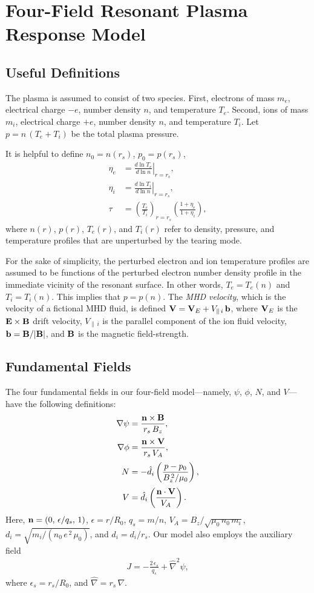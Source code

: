 \documentclass[12pt,prb,aps]{revtex4-1}
\begin{document}
\section{Four-Field Resonant Plasma Response Model}\label{sfour}
\subsection{Useful Definitions}
The plasma is assumed to consist of two species. First, electrons of mass $m_e$, electrical charge $-e$, 
number density $n$, and temperature $T_e$.  Second, ions of mass $m_i$, electrical charge $+e$,  
number density $n$, and temperature $T_i$. Let $p=n\,(T_e+T_i)$ be the total plasma pressure. 

It is helpful to define $n_0 = n(r_s)$, $p_0= p(r_s)$,
\begin{align}
\eta_e &=\left.\frac{d\ln T_e}{d\ln n}\right|_{r=r_s},\label{e211}\\[0.5ex]
\eta_i &= \left.\frac{d\ln T_i}{d\ln n}\right|_{r=r_s},\\[0.5ex]
\tau &= \left(\frac{T_e}{T_i}\right)_{r=r_s}\left(\frac{1+\eta_e}{1+\eta_i}\right),\label{e213}
\end{align}
where $n(r)$, $p(r)$, $T_e(r)$, and $T_i(r)$ refer to
density, pressure, and temperature profiles that are unperturbed by the tearing mode. 

For the sake of simplicity, the perturbed electron and ion temperature profiles are assumed to be functions of
the perturbed electron number density profile in the immediate vicinity of the resonant surface. In other words, $T_e=T_e(n)$ and $T_i=T_i(n)$. This
implies that $p=p(n)$. 
The {\em MHD velocity}, which is the velocity of a
fictional MHD fluid, is defined ${\bf V}={\bf V}_E + V_{\parallel\,i}\,{\bf b}$, where ${\bf V}_E$ is the
${\bf E}\times{\bf B}$ drift velocity, $V_{\parallel\,i}$ is the parallel component of the ion fluid
velocity, ${\bf b}= {\bf B}/|{\bf B}|$, and ${\bf B}$ is the magnetic field-strength.

\subsection{Fundamental Fields}
The four fundamental fields in our four-field model---namely, $\psi$, $\phi$, $N$, and $V$---have the following
definitions:
\begin{align}\label{e10}
\nabla\psi &= \frac{{\bf n}\times{\bf B}} {r_s\,B_z},\\[0.5ex]
\nabla\phi &= \frac{{\bf n}\times {\bf V}}{r_s\,V_A},\\[0.5ex]
N &=-\hat{d}_i\left(\frac{p-p_0}{B_z^{\,2}/\mu_0}\right),\\[0.5ex]
V &= \hat{d}_i\left(\frac{{\bf n}\cdot {\bf V}}{V_A}\right).\label{e13}
\end{align}
Here,   ${\bf n} = (0,\,\epsilon/q_s,\,1)$, $\epsilon = r/R_0$, $q_s=m/n$, 
$V_A =B_z/\sqrt{\mu_0\,n_0\,m_i}$, 
$d_i = \sqrt{m_i/(n_0\,e^{\,2}\,\mu_0)}$,
and $\hat{d}_i=d_i/r_s$. 
 Our
model also employs the auxiliary field
\begin{align}\label{e16}
J=-\frac{2\,\epsilon_s}{q_s}+\hat{\nabla}^2\psi,
\end{align}
where 
$\epsilon_s=r_s/R_0$, and $\hat{\nabla} = r_s\,\nabla$. 
\end{document}
